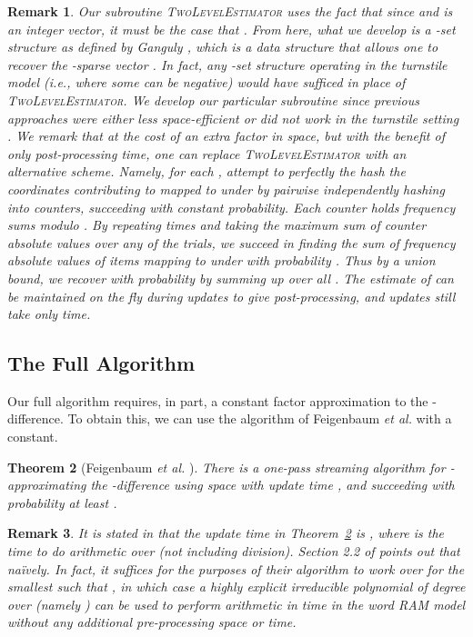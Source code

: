 \documentclass[letterpaper,11pt]{article}
\newcommand{\SectionName}[1]{\label{sec:#1}}
\newcommand{\TheoremName}[1]{\label{thm:#1}}
\newcommand{\Theorem}[1]{Theorem~\ref{thm:#1}}
\newtheorem{theorem}{Theorem}\newtheorem{corollary}[theorem]{Corollary}
\newtheorem{remark}[theorem]{Remark}
\newcommand{\proofbelow}{3pt}
\newcommand{\afterproof}{\hfill  \par \vspace{\proofbelow}}
\begin{document}
\begin{remark}
Our subroutine \textsc{TwoLevelEstimator} uses the fact that since
 and  is an integer vector, it must be the case that .  From here, what we develop is a {\em -set structure} as
defined by Ganguly \cite{Ganguly07}, which is a data structure
that allows one to recover the -sparse vector .  In fact, any
-set structure operating in the turnstile model (i.e., where some
 can be negative) would have sufficed in place of
\textsc{TwoLevelEstimator}.  We develop our
particular subroutine since previous approaches were either less
space-efficient or did not work in the turnstile setting
\cite{GM06,Ganguly07}.  We remark that at the cost of an
extra  factor in space, but with the benefit of only
 post-processing time, one can replace
\textsc{TwoLevelEstimator} with an alternative scheme.  Namely, for each
, attempt to perfectly the hash the  coordinates contributing to  mapped to  under  by
pairwise independently hashing into
 counters, succeeding with
constant probability.  Each counter holds frequency sums modulo .
By repeating 
times and taking the maximum sum of counter absolute values over any
of the  trials, we succeed in finding the sum of frequency absolute
values of items mapping to  under  with probability . Thus
by a union bound, we recover  with probability  by
summing up over all .  The
estimate of  can be maintained on the fly during updates to
give  post-processing, and
updates still take only  time.
\end{remark}

\subsection{The Full Algorithm}\SectionName{full-stream}
Our full algorithm requires, in part, a constant factor approximation
to the -difference.  To obtain this, we can use the algorithm of
Feigenbaum {\it et al.} \cite{FKSV02} with  a constant.

\begin{theorem}[Feigenbaum {\it et al.} {\cite[Theorem
    12]{FKSV02}}]\TheoremName{feig}
There is a one-pass streaming algorithm for -approximating
the -difference using 
space with update time , and succeeding with
probability at least .\afterproof
\end{theorem}

\begin{remark}
It is stated in \cite{FKSV02} that the update time
in \Theorem{feig} is ,
where  is the time to do arithmetic over
 (not including division).  Section 2.2 of
\cite{FKSV02} points out that
 na\"{i}vely. In fact, it suffices for the
purposes of their algorithm to work over  for the smallest
 such that , in which case a highly
explicit irreducible polynomial of degree  over 
(namely  \cite[Theorem 1.1.28]{vanLint99})
can be used to perform  arithmetic in time
 in the word RAM model without any additional pre-processing
space or time.
\end{remark}
\end{document}
